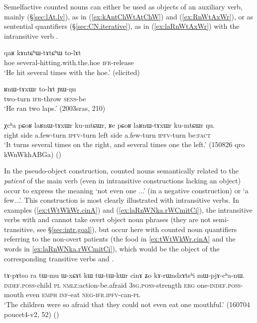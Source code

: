 Semelfactive counted nouns can either be used as objects of an auxiliary verb, mainly  (§\ref{sec:lAt.lv}), as in (\ref{ex:kAntChWtAtChW}) and (\ref{ex:RnWtAxWr}), or as sentential quantifiers (§\ref{sec:CN.iterative}), as in (\ref{ex:laRnWtAxWr}) with the intransitive verb .

\begin{exe}
	\ex \label{ex:kAntChWtAtChW}
	\gll qaʁ kɤntɕʰɯ-tɤtɕʰɯ to-lɤt \\
	hoe several-hitting.with.the.hoe \textsc{ifr}-release \\
	\glt `He hit several times with the hoe.' (elicited)
\end{exe}

\begin{exe}
	\ex \label{ex:RnWtAxWr}
	\gll ʁnɯ-tɤxɯr to-lɤt ɲɯ-ŋu \\
	two-turn \textsc{ifr}-throw \textsc{sens}-be \\
	\glt `He ran two laps.' (2003sras, 210)
\end{exe}

\begin{exe}
	\ex \label{ex:laRnWtAxWr}
	\gll χcʰa pɕoʁ laʁnɯ-tɤxɯr ku-mtɕɯr, ʁe pɕoʁ laʁnɯ-tɤxɯr ku-mtɕɯr ŋu. \\
	right side a.few-turn \textsc{ipfv}-turn left side a.few-turn \textsc{ipfv}-turn be:\textsc{fact} \\
	\glt `It turns several times on the right, and several times one the left.' (150826 qro kWnWkhABGa)
()
\end{exe}


In the pseudo-object construction, counted nouns semantically related to the \textit{patient} of the main verb (even in intransitive constructions lacking an object) occur to express the meaning `not even one ...' (in a negative construction) or `a few...'. This construction is most clearly illustrated with intransitive verbs. In examples (\ref{ex:tWtWkWr.cinA}) and (\ref{ex:laRnWNka.rWCmitCi}), the intransitive verbs with  and  cannot take overt object noun phrases (they are not semi-transitive, see §\ref{sec:intr.goal}), but occur here with counted noun quantifiers referring to the non-overt patients (the food in \ref{ex:tWtWkWr.cinA} and the words in \ref{ex:laRnWNka.rWCmitCi}), which would be the object of the corresponding transitive verbs  and  .


\begin{exe}
	\ex \label{ex:tWtWkWr.cinA}
	\gll tɤ-pɤtso ra tɯ-mu ɯ-xɕɤt kɯ tɯ-tɯ-kɯr cinɤ ʑo kɤ-rɯndzɤtsʰi mɯ-pjɤ-cʰa-nɯ. \\
	\textsc{indef}.\textsc{poss}-child \textsc{pl} \textsc{nmlz}:action-be.afraid \textsc{3sg}.\textsc{poss}-strength \textsc{erg} one-\textsc{indef}.\textsc{poss}-mouth even \textsc{emph} \textsc{inf}-eat \textsc{neg}-\textsc{ifr}.\textsc{ipfv}-can-\textsc{pl} \\
	\glt `The children were so afraid that they could not even eat one mouthful.' (160704 poucet4-v2, 52)
()
\end{exe}

